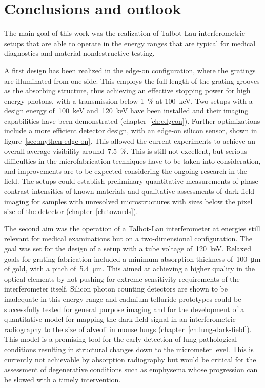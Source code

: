 \chapter{Conclusions and outlook}\label{ch:conclusions}
The main goal of this work was the realization of Talbot-Lau interferometric
setups that are able to operate in the energy ranges that are typical for
medical diagnostics and material nondestructive testing.

A first design has been realized in the edge-on configuration, where the
gratings are illuminated from one side. This employs the full length of the
grating grooves as the absorbing structure, thus achieving an effective
stopping power for high energy photons, with a transmission below
\SI{1}{\percent} at \SI{100}{\kilo\eV}. Two setups with a design energy
of~\SI{100}{\kilo\eV} and~\SI{120}{\kilo\eV} have been installed and their
imaging capabilities have been demonstrated (chapter~\ref{ch:edgeon}).
Further optimizations include a more efficient detector design, with an
edge-on silicon sensor, shown in figure~\ref{sec:mythen-edge-on}. This
allowed the current experiments to achieve an overall average visibility
around~\SI{7.5}{\percent}. This is still not excellent, but serious
difficulties in the microfabrication techniques have to be taken into
consideration, and improvements are to be expected considering the ongoing
research in the field. The setups could establish preliminary quantitative
measurements of phase contrast intensities of known materials and
qualitative assessments of dark-field imaging for samples with unresolved
microstructures with sizes below the pixel size of the detector
(chapter~\ref{ch:towards}).

The second aim was the operation of a Talbot-Lau interferometer at energies
still relevant for medical examinations but on a two-dimensional
configuration. The goal was set for the design of a setup with a tube
voltage of~\SI{120}{\kilo\eV}. Relaxed goals for grating fabrication
included a minimum absorption thickness of~\SI{100}{\micro\meter} of gold,
with a pitch of~\SI{5.4}{\micro\meter}. This aimed at achieving a higher
quality in the optical elements by not pushing for extreme sensitivity
requirements of the interferometer itself.
Silicon photon counting detectors are shown
to be inadequate in this energy range and cadmium telluride prototypes could
be successfully tested for general purpose imaging and for the development
of a quantitative model for mapping the dark-field signal in an
interferometric radiography to the size of alveoli in mouse lungs
(chapter~\ref{ch:lung-dark-field}). This model is a promising tool for the early detection of lung pathological
conditions resulting in structural changes down to the micrometer level. This is currently not achievable by absorption radiography but
would be critical for the assessment of degenerative conditions such as
emphysema whose progression can be slowed with a timely intervention.

